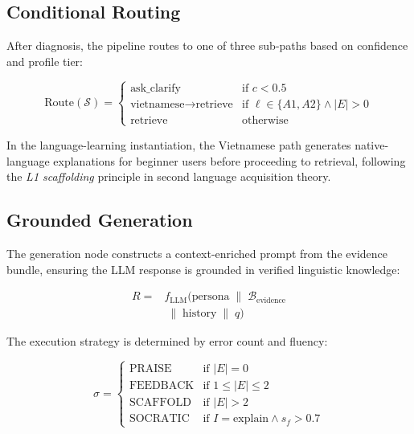 \documentclass[11pt,a4paper,twocolumn]{article}
\begin{document}
\subsection{Conditional Routing}

After diagnosis, the pipeline routes to one of three sub-paths based on confidence and profile tier:

\begin{equation}
\text{Route}(\mathcal{S}) = \begin{cases}
  \text{ask\_clarify} & \text{if } c < 0.5 \\
  \text{vietnamese} \to \text{retrieve} & \text{if } \ell \in \{A1, A2\} \wedge |E| > 0 \\
  \text{retrieve} & \text{otherwise}
\end{cases}
\end{equation}

In the language-learning instantiation, the Vietnamese path generates native-language explanations for beginner users before proceeding to retrieval, following the \emph{L1 scaffolding} principle in second language acquisition theory.

\subsection{Grounded Generation}

The generation node constructs a context-enriched prompt from the evidence bundle, ensuring the LLM response is grounded in verified linguistic knowledge:

\begin{equation}
\begin{aligned}
R ={}& f_\text{LLM}\big(\text{persona} \;\|\; \mathcal{B}_\text{evidence} \\
& \;\|\; \text{history} \;\|\; q\big)
\end{aligned}
\end{equation}

The execution strategy is determined by error count and fluency:

\begin{equation}
\label{eq:strategy}
\sigma = \begin{cases}
  \text{PRAISE} & \text{if } |E| = 0 \\
  \text{FEEDBACK} & \text{if } 1 \leq |E| \leq 2 \\
  \text{SCAFFOLD} & \text{if } |E| > 2 \\
  \text{SOCRATIC} & \text{if } I = \text{explain} \wedge s_f > 0.7
\end{cases}
\end{equation}
\end{document}
